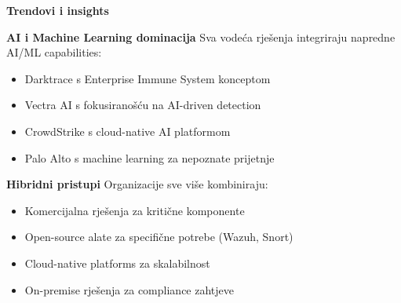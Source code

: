 \textbf{Trendovi i insights}

\textbf{AI i Machine Learning dominacija}
Sva vodeća rješenja integriraju napredne AI/ML capabilities:
\begin{itemize}
\item Darktrace s Enterprise Immune System konceptom
\item Vectra AI s fokusiranošću na AI-driven detection
\item CrowdStrike s cloud-native AI platformom
\item Palo Alto s machine learning za nepoznate prijetnje
\end{itemize}

\textbf{Hibridni pristupi}
Organizacije sve više kombiniraju:
\begin{itemize}
\item Komercijalna rješenja za kritične komponente
\item Open-source alate za specifične potrebe (Wazuh, Snort)
\item Cloud-native platforms za skalabilnost
\item On-premise rješenja za compliance zahtjeve
\end{itemize}